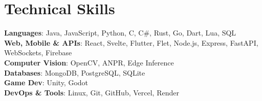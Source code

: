 \documentclass[letterpaper,11pt]{article}
\begin{document}
\section{Technical Skills}
 \begin{itemize}[leftmargin=0.15in, label={}]
    \small{\item{
     \textbf{Languages}{: Java, JavaScript, Python, C, C\#, Rust, Go, Dart, Lua, SQL} \\
     \textbf{Web, Mobile \& APIs}{: React, Svelte, Flutter, Flet, Node.js, Express, FastAPI, WebSockets, Firebase} \\
     \textbf{Computer Vision}{: OpenCV, ANPR, Edge Inference} \\
     \textbf{Databases}{: MongoDB, PostgreSQL, SQLite} \\
     \textbf{Game Dev}{: Unity, Godot} \\
     \textbf{DevOps \& Tools}{: Linux, Git, GitHub, Vercel, Render}
    }}
 \end{itemize}


\end{document}
